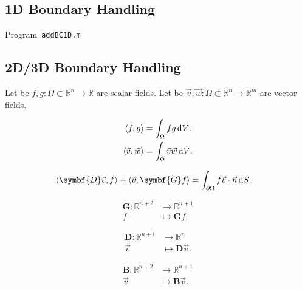 \subsection{1D Boundary Handling}

\begin{octavelisting}
	\tiny
	\centering
	\caption{Program~\texttt{addBC1D.m}}
	\label{code:addBC1D.m}
\end{octavelisting}

\subsection{2D/3D Boundary Handling}

Let be
\begin{math}
	f,g\colon\Omega\subset\mathbb{R}^{n}\to
	\mathbb{R}
\end{math}
are scalar fields.
Let be
\begin{math}
	\vec{v},\vec{w}\colon\Omega\subset\mathbb{R}^{n}\to
	\mathbb{R}^{m}
\end{math}
are vector fields.

\begin{align*}
	\left\langle
	f,g
	\right\rangle & =
	\int_{\Omega}fg \dl V. \\
	\left\langle
	\vec{v},\vec{w}
	\right\rangle & =
	\int_{\Omega}\vec{v}\vec{w}\dl V.
\end{align*}

\begin{align*}
	\left\langle
	\symbf{D}\vec{v},
	f
	\right\rangle+
	\left\langle
	\vec{v},
	\symbf{G}f
	\right\rangle & =
	\int_{\partial\Omega}
	f\vec{v}\cdot\vec{n}\dl S.
\end{align*}

\begin{align*}
	\symbf{G}\colon\mathbb{R}^{n+2} & \longrightarrow
	\mathbb{R}^{n+1}                                  \\
	f                               & \longmapsto
	\symbf{G}f.
\end{align*}

\begin{align*}
	\symbf{D}\colon\mathbb{R}^{n+1} & \longrightarrow
	\mathbb{R}^{n}                                    \\
	\vec{v}                         & \longmapsto
	\symbf{D}\vec{v}.
\end{align*}

\begin{align*}
	\symbf{B}\colon\mathbb{R}^{n+2} & \longrightarrow
	\mathbb{R}^{n+1}                                  \\
	\vec{v}                         & \longmapsto
	\symbf{B}\vec{v}.
\end{align*}

